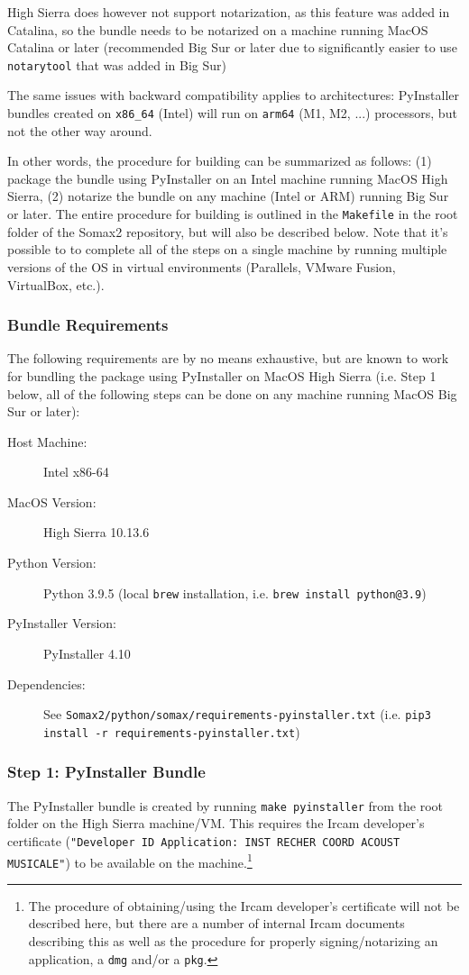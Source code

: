 High Sierra does however not support notarization, as this feature was added in Catalina, so the bundle needs to be notarized on a machine running MacOS Catalina or later (recommended Big Sur or later due to significantly easier to use \texttt{notarytool} that was added in Big Sur)

The same issues with backward compatibility applies to architectures: PyInstaller bundles created on \texttt{x86\_64} (Intel) will run on \texttt{arm64} (M1, M2, ...) processors, but not the other way around. 

In other words, the procedure for building can be summarized as follows: (1) package the bundle using PyInstaller on an Intel machine running MacOS High Sierra, (2) notarize the bundle on any machine (Intel or ARM) running Big Sur or later. The entire procedure for building is outlined in the \texttt{Makefile} in the root folder of the Somax2 repository, but will also be described below. Note that it's possible to to complete all of the steps on a single machine by running multiple versions of the OS in virtual environments (Parallels, VMware Fusion, VirtualBox, etc.).

\subsubsection{Bundle Requirements}
The following requirements are by no means exhaustive, but are known to work for bundling the package using PyInstaller on MacOS High Sierra (i.e. Step 1 below, all of the following steps can be done on any machine running MacOS Big Sur or later):

\begin{description}
	\item [Host Machine:] Intel x86-64
	\item [MacOS Version:] High Sierra 10.13.6
	\item [Python Version:] Python 3.9.5 (local \texttt{brew} installation, i.e. \texttt{brew install python@3.9})
	\item [PyInstaller Version:] PyInstaller 4.10
	\item [Dependencies:] See \texttt{Somax2/python/somax/requirements-pyinstaller.txt} (i.e. \texttt{pip3 install -r requirements-pyinstaller.txt})
\end{description}

\subsubsection{Step 1: PyInstaller Bundle}
The PyInstaller bundle is created by running \texttt{make pyinstaller} from the root folder on the High Sierra machine/VM. This requires the Ircam developer's certificate (\texttt{"Developer ID Application: INST RECHER COORD ACOUST MUSICALE"}) to be available on the machine.\footnote{The procedure of obtaining/using the Ircam developer's certificate will not be described here, but there are a number of internal Ircam documents describing this as well as the procedure for properly signing/notarizing an application, a \texttt{dmg} and/or a \texttt{pkg}.} 

